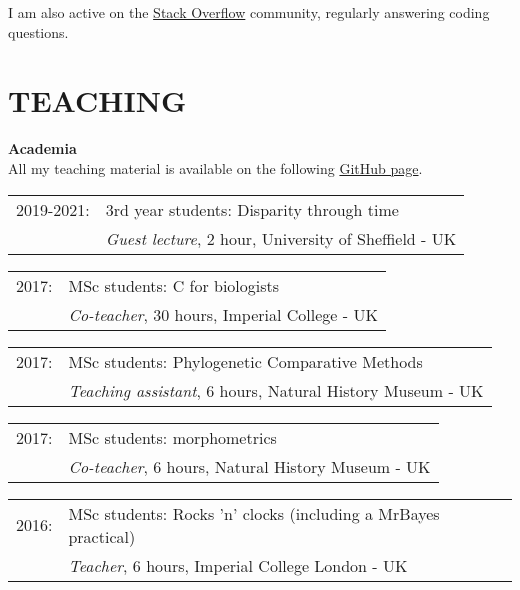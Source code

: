 \documentclass[10pt,a4paper]{article}
\begin{document}
{I am also active on the \href{https://stackoverflow.com/users/9281298/thomas-guillerme}{Stack Overflow} community, regularly answering coding questions.


\section{TEACHING}
\bigskip

\raggedright\textbf{Academia}\\[1.5ex]
All my teaching material is available on the following \href{https://github.com/TGuillermeTeaching}{GitHub page}.

\begin{tabular}{ll}
2019-2021: & 3rd year students: Disparity through time\\
           & \textit{Guest lecture}, 2 hour, University of Sheffield - UK \\
\end{tabular}

\begin{tabular}{ll}
2017: & MSc students: C for biologists\\
      & \textit{Co-teacher}, 30 hours, Imperial College - UK \\
\end{tabular}

\begin{tabular}{ll}
2017: & MSc students: Phylogenetic Comparative Methods\\
      & \textit{Teaching assistant}, 6 hours, Natural History Museum - UK \\
\end{tabular}

\begin{tabular}{ll}
2017: & MSc students: morphometrics\\
      & \textit{Co-teacher}, 6 hours, Natural History Museum - UK \\
\end{tabular}

\begin{tabular}{ll}
2016: & MSc students: Rocks 'n' clocks (including a MrBayes practical)\\
      & \textit{Teacher}, 6 hours, Imperial College London - UK \\
\end{tabular}

}
\end{document}
